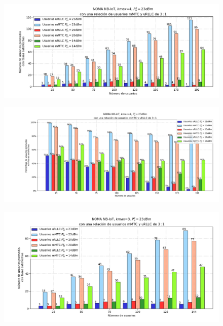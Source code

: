 \begin{figure}[th]
    \centering
    \includegraphics[scale=.6]{Figures/ResultadosNOMA/Kmax4_DiferentesPM.png}
    \decoRule
    \caption[]{}
    \label{fig:}
\end{figure}

\begin{figure}[th]
    \centering
    \includegraphics[scale=.4]{Figures/ResultadosNOMA/Kmax4_DiferentesPM_Porcentual.png}
    \decoRule
    \caption[]{}
    \label{fig:}
\end{figure}

\begin{figure}[th]
    \centering
    \includegraphics[scale=.6]{Figures/ResultadosNOMA/Kmax3_DiferentesPM.png}
    \decoRule
    \caption[]{}
    \label{fig:}
\end{figure}

